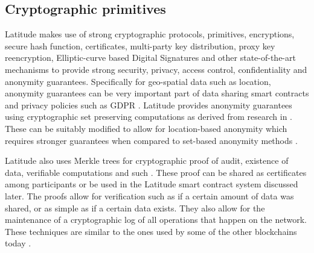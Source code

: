 
\subsection{Cryptographic primitives}
\label{sec:crypto}
Latitude makes use of strong cryptographic protocols, primitives, encryptions, secure hash function, certificates,
multi-party key distribution, proxy key reencryption, Elliptic-curve based Digital Signatures \cite{ecdsa} and other
state-of-the-art mechanisms to provide strong security, privacy, access control, confidentiality and anonymity
guarantees. Specifically for geo-spatial data such as location, anonymity guarantees can be very important part of data
sharing smart contracts and privacy policies such as GDPR \cite{gdpr}. Latitude provides anonymity guarantees using
cryptographic set preserving computations as derived from research in \cite{kissner_set}. These can be suitably modified
to allow for location-based anonymity which requires stronger guarantees when compared to set-based anonymity methods
\cite{divanis_kanon,xu_loc_anon}.

Latitude also uses Merkle trees for cryptographic proof of audit, existence of data, verifiable computations and such
\cite{becker2008}. These proof can be shared as certificates among participants or be used in the Latitude smart
contract system discussed later. The proofs allow for verification such as if a certain amount of data was shared, or as
simple as if a certain data exists. They also allow for the maintenance of a cryptographic log of all operations that
happen on the network. These techniques are similar to the ones used by some of the other blockchains today
\cite{buterin_merkle}.


%


